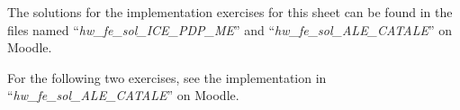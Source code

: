 \documentclass[a4paper]{article}
\begin{document}

The solutions for the implementation exercises for this sheet can be found in the files named ``\textit{hw\_fe\_sol\_ICE\_PDP\_ME}'' and ``\textit{hw\_fe\_sol\_ALE\_CATALE}'' on Moodle.



\dlz



\dlz


For the following two exercises, see the implementation in ``\textit{hw\_fe\_sol\_ALE\_CATALE}'' on Moodle.



\dlz

\newpage


\end{document}
